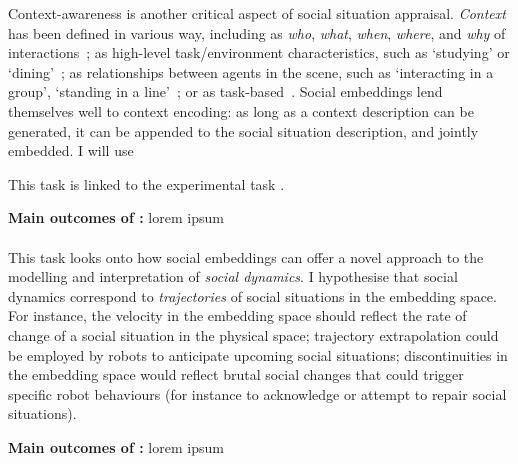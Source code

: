 Context-awareness is another critical aspect of social situation appraisal.
\emph{Context} has been defined in various way, including as \emph{who},
\emph{what}, \emph{when}, \emph{where}, and \emph{why} of
interactions~\cite{vinciarelli2009social}; as high-level task/environment
characteristics, such as `studying' or `dining'~\cite{nigam2015social}; as
relationships between agents in the scene, such as `interacting in a group',
`standing in a line'~\cite{althaus2004navigation}; or as
task-based~\cite{castellano2012detecting}. Social embeddings lend themselves
well to context encoding: as long as a context description can be generated, it
can be appended to the social situation description, and jointly embedded.
I will use 
%


This task is linked to the experimental task \TDB.


\begin{framed}
    {\noindent\bf Main outcomes of \tBA:} lorem ipsum 
\end{framed}

\paragraph{\TBB}

This task looks onto how social embeddings can offer a novel approach to the
modelling and interpretation of \emph{social dynamics}. I hypothesise that
social dynamics correspond to \emph{trajectories} of social situations in the
embedding space.  For instance, the velocity in the embedding space should
reflect the rate of change of a social situation in the physical space;
trajectory extrapolation could be employed by robots to anticipate upcoming
social situations; discontinuities in the embedding space would reflect brutal
social changes that could trigger specific robot behaviours (for instance to
acknowledge or attempt to repair social situations).  


\begin{framed}
    {\noindent\bf Main outcomes of \tBC:} lorem ipsum 
\end{framed}

